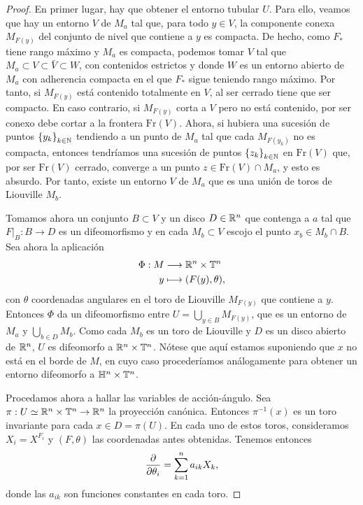 \begin{proof}
  En primer lugar, hay que obtener el entorno tubular $U$. Para ello, veamos que hay un entorno $V$ de $M_a$ tal que, para todo $y\in V$, la componente conexa $M_{F(y)}$ del conjunto de nivel que contiene a $y$ es compacta. De hecho, como $F_*$ tiene rango máximo y $M_a$ es compacta, podemos tomar $V$ tal que $M_a\subset V \subset \bar{V} \subset W$, con contenidos estrictos y donde $W$ es un entorno abierto de $M_a$ con adherencia compacta en el que $F_*$ sigue teniendo rango máximo. Por tanto, si $M_{F(y)}$ está contenido totalmente en $V$, al ser cerrado tiene que ser compacto. En caso contrario, si $M_{F(y)}$ corta a $V$ pero no está contenido, por ser conexo debe cortar a la frontera $\mathrm{Fr}(V)$. Ahora, si hubiera una sucesión de puntos $\left\{ y_k \right\}_{k\in \mathbb{N}}$ tendiendo a un punto de $M_a$ tal que cada $M_{F(y_k)}$ no es compacta, entonces tendríamos una sucesión de puntos $\left\{ z_k \right\}_{k\in \mathbb{N}}$ en $\mathrm{Fr}(V)$ que, por ser $\mathrm{Fr}(V)$ cerrado, converge a un punto $z\in \mathrm{Fr}(V) \cap M_a$, y esto es absurdo. Por tanto, existe un entorno $V$ de $M_a$ que es una unión de toros de Liouville $M_b$. 

  Tomamos ahora un conjunto $B\subset V$ y un disco $D\in \mathbb{R}^n$ que contenga a $a$ tal que $\left. F\right|_{B}:B\rightarrow D$ es un difeomorfismo y en cada $M_b\subset V$ escojo el punto $x_b\in M_b\cap B$. Sea ahora la aplicación 
  \begin{align*}
    \Phi :M&\longrightarrow \mathbb{R}^n\times \mathbb{T}^n\\ 
      y &\longmapsto (F(y),\theta),
    \end{align*}
    con $\theta$ coordenadas angulares en el toro de Liouville $M_{F(y)}$ que contiene a $y$. Entonces $\Phi$ da un difeomorfismo entre $U=\bigcup_{y\in B}M_{F(y)}$, que es un entorno de $M_a$ y $\bigcup_{b\in D}M_b$. Como cada $M_b$ es un toro de Liouville y $D$ es un disco abierto de $\mathbb{R}^n$, $U$ es difeomorfo a $\mathbb{R}^n\times \mathbb{T}^n$.
  Nótese que aquí estamos suponiendo que $x$ no está en el borde de $M$, en cuyo caso procederíamos análogamente para obtener un entorno difeomorfo a $\mathbb{H}^n \times \mathbb{T}^n$.

 Procedamos ahora a hallar las variables de acción-ángulo. Sea $\pi:U\simeq \mathbb{R}^n \times \mathbb{T}^n \rightarrow \mathbb{R}^n$ la proyección canónica. Entonces $\pi^{-1}(x)$ es un toro invariante para cada $x \in D=\pi(U)$. En cada uno de estos toros, consideramos $X_i=X^{F_i}$ y $(F,\theta)$ las coordenadas antes obtenidas. Tenemos entonces
\[
  \frac{\partial}{\partial \theta_i} = \sum_{k=1}^n a_{ik}X_k,
\]
donde las $a_{ik}$ son funciones constantes en cada toro.


\end{proof}
